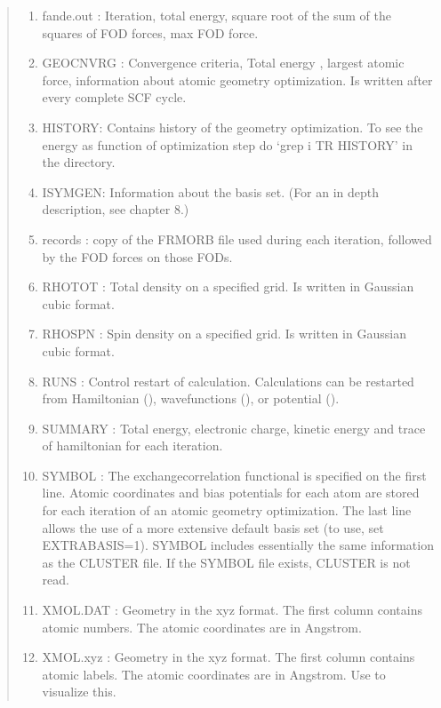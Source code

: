 \documentclass[letterpaper,10pt,english,openany,oneside]{sphinxmanual}
\begin{document}
\begin{quote}
\begin{enumerate}
\item {} 
\sphinxAtStartPar
fande.out : Iteration, total energy, square root of the sum of the squares of FOD forces, max FOD force.

\item {} 
\sphinxAtStartPar
GEOCNVRG : Convergence criteria, Total energy , largest atomic force, information about atomic geometry
optimization.  Is written after every complete SCF cycle.

\item {} 
\sphinxAtStartPar
HISTORY:   Contains history of the geometry optimization. To see the energy as function of optimization step
do ‘grep \sphinxhyphen{}i TR HISTORY’ in the directory.

\item {} 
\sphinxAtStartPar
ISYMGEN: Information about the basis set. (For an in depth description, see chapter 8.)

\item {} 
\sphinxAtStartPar
records  : copy of the FRMORB file used during each iteration, followed by the FOD forces on those FODs.

\item {} 
\sphinxAtStartPar
RHOTOT  : Total density on a specified grid. Is written in Gaussian cubic format.

\item {} 
\sphinxAtStartPar
RHOSPN  : Spin density on a specified grid. Is written in Gaussian cubic format.

\item {} 
\sphinxAtStartPar
RUNS    :  Control restart of calculation. Calculations can be restarted from Hamiltonian (), wavefunctions (), or potential ().

\item {} 
\sphinxAtStartPar
SUMMARY : Total energy, electronic charge, kinetic energy and trace of hamiltonian for each
iteration.

\item {} 
\sphinxAtStartPar
SYMBOL : The exchange\sphinxhyphen{}correlation functional is specified on the first line. Atomic coordinates and bias potentials for each atom are stored for each
iteration of an atomic geometry optimization. The last line allows the use of a more extensive default basis set (to use, set EXTRABASIS=1).
SYMBOL includes essentially the same information as the CLUSTER file. If the SYMBOL file exists, CLUSTER is not read.

\item {} 
\sphinxAtStartPar
XMOL.DAT : Geometry in the xyz format. The first column contains atomic numbers. The atomic coordinates are in Angstrom.

\item {} 
\sphinxAtStartPar
XMOL.xyz : Geometry in the xyz format. The first column contains atomic labels. The atomic coordinates are in Angstrom. Use  to visualize this.

\end{enumerate}
\end{quote}
\end{document}
